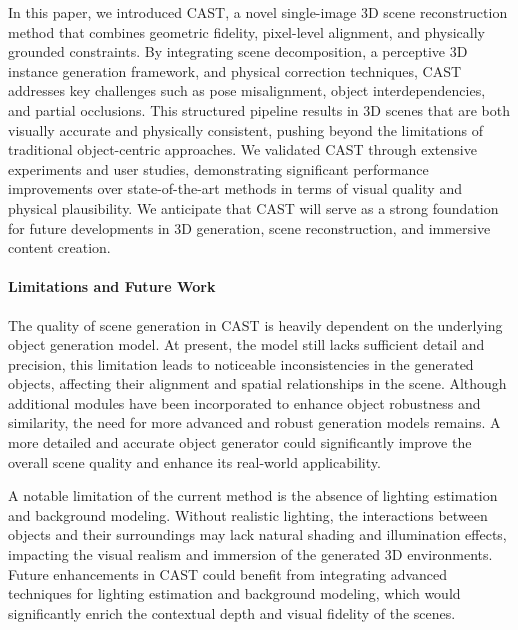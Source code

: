 
In this paper, we introduced CAST, a novel single-image 3D scene reconstruction method that combines geometric fidelity, pixel-level alignment, and physically grounded constraints. By integrating scene decomposition, a perceptive 3D instance generation framework, and physical correction techniques, CAST addresses key challenges such as pose misalignment, object interdependencies, and partial occlusions. This structured pipeline results in 3D scenes that are both visually accurate and physically consistent, pushing beyond the limitations of traditional object-centric approaches. We validated CAST through extensive experiments and user studies, demonstrating significant performance improvements over state-of-the-art methods in terms of visual quality and physical plausibility. We anticipate that CAST will serve as a strong foundation for future developments in 3D generation, scene reconstruction, and immersive content creation.





\paragraph{Limitations and Future Work}

The quality of scene generation in CAST is heavily dependent on the underlying object generation model. At present, the model still lacks sufficient detail and precision, this limitation leads to noticeable inconsistencies in the generated objects, affecting their alignment and spatial relationships in the scene. Although additional modules have been incorporated to enhance object robustness and similarity, the need for more advanced and robust generation models remains. A more detailed and accurate object generator could significantly improve the overall scene quality and enhance its real-world applicability.


A notable limitation of the current method is the absence of lighting estimation and background modeling. Without realistic lighting, the interactions between objects and their surroundings may lack natural shading and illumination effects, impacting the visual realism and immersion of the generated 3D environments. Future enhancements in CAST could benefit from integrating advanced techniques for lighting estimation and background modeling, which would significantly enrich the contextual depth and visual fidelity of the scenes.


